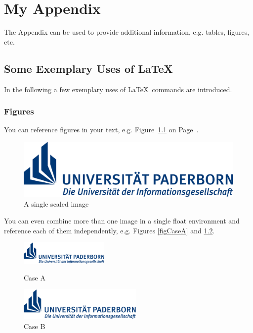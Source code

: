 \chapter{My Appendix}\label{secAppendixA}

The Appendix can be used to provide additional information, e.g. tables, figures, etc.


\section{Some Exemplary Uses of \LaTeX}

In the following a few exemplary uses of \LaTeX~commands are introduced.

\subsection{Figures}\label{secFigures}

You can reference figures in your text, e.g. Figure~\ref{figUniKralle} on Page~\pageref{figUniKralle}.

\begin{figure}[htb]
	\centering
	\includegraphics[scale=0.5]{Images/TitlePage/uni-logo}
	\caption{A single scaled image}
	\label{figUniKralle}
\end{figure}

You can even combine more than one image in a single float environment and reference each of them independently, e.g. Figures \ref{figCaseA} and \ref{figCaseB}.

\begin{figure}[h]
	\centering
  \begin{minipage}[t]{.47\textwidth}
    \centering
    \includegraphics[width=4.3cm]{Images/TitlePage/uni-logo} 
    \caption{Case A}
    \label{figCaseA}
  \end{minipage}%
  \hfill
  \begin{minipage}[t]{.47\textwidth}
    \centering
    \includegraphics[width=6cm]{Images/TitlePage/uni-logo}
    \caption{Case B}
    \label{figCaseB}
  \end{minipage}
\end{figure}

